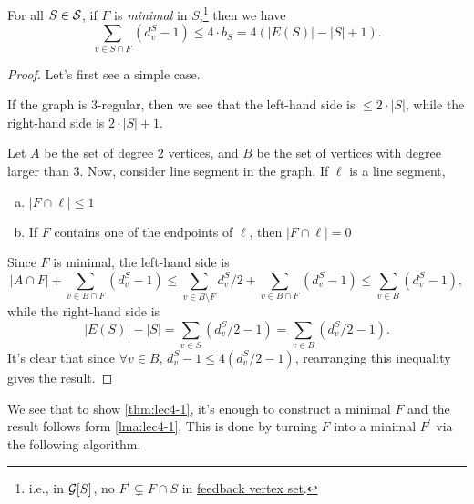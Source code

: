 \begin{lemma}\label{lma:lec4-2}
	For all \(S\in \mathcal{\MakeUppercase{S}} \), if \(F\) is \emph{minimal} in \(S\),\footnote{i.e., in \(\mathcal{\MakeUppercase{g}} [S]\), no \(F^\prime \subsetneq F \cap S\) in \hyperref[prb:feedback-vertex-set]{feedback vertex set}.} then we have
	\[
		\sum_{v\in S \cap F}(d_{v} ^S - 1) \leq 4\cdot b_S = 4(\left\vert E(S) \right\vert - \left\vert S \right\vert + 1).
	\]
\end{lemma}
\begin{proof}
	Let's first see a simple case.
	\begin{intuition}
		If the graph is \(3\)-regular, then we see that the left-hand side is \(\leq 2\cdot \left\vert S \right\vert \), while the right-hand side is \(2\cdot \left\vert S \right\vert + 1\).
	\end{intuition}

	Let \(A\) be the set of degree \(2\) vertices, and \(B\) be the set of vertices with degree larger than \(3\). Now, consider line segment in the graph. If \(\ell \) is a line segment,
	\begin{enumerate}[(a)]
		\item \(\left\vert F \cap  \ell  \right\vert \leq 1\)
		\item If \(F\) contains one of the endpoints of \(\ell \), then \(\left\vert F \cap \ell  \right\vert = 0\)
	\end{enumerate}

	Since \(F\) is minimal, the left-hand side is
	\[
		\left\vert A \cap  F \right\vert + \sum_{v\in B \cap F}(d_{v} ^S - 1) \leq \sum_{v\in B \setminus F} d_{v} ^S / 2 + \sum_{v\in B \cap F}(d_{v} ^S - 1) \leq \sum_{v\in B}(d_{v}^S - 1 ),
	\]
	while the right-hand side is
	\[
		\left\vert E(S) \right\vert - \left\vert S \right\vert = \sum_{v\in S}(d_{v} ^S / 2 - 1) = \sum_{v\in B} (d_{v} ^S / 2 - 1).
	\]
	It's clear that since \(\forall v\in B\), \(d_v^S - 1 \leq 4 (d_{v} ^S / 2 - 1)\), rearranging this inequality gives the result.
\end{proof}

We see that to show \autoref{thm:lec4-1}, it's enough to construct a minimal \(F\) and the result follows form \autoref{lma:lec4-1}. This is done by turning \(F\) into a minimal \(F^\prime \) via the following algorithm.\par

